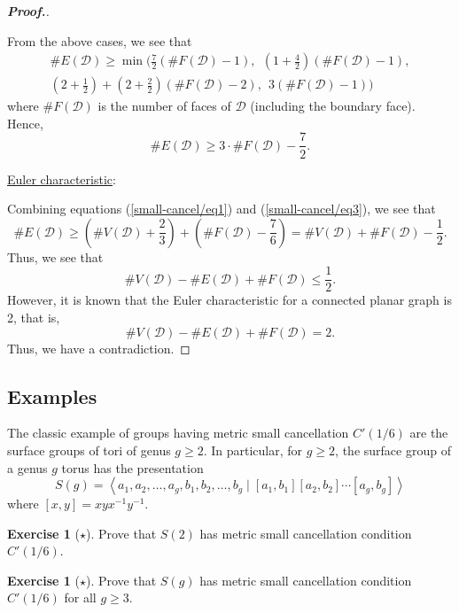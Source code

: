 \documentclass[11pt,a4paper,reqno]{amsart}
\theoremstyle{plain}
\theoremstyle{definition}
\theoremstyle{definition}
\newtheorem{exercise}[theorem]{Exercise}
\renewcommand\leq\leqslant
\renewcommand\geq\geqslant
\newenvironment{myproof}{\begin{proof}[\normalfont\bfseries Proof.]}{\end{proof}}
\newcommand\exerciseLevelEasy{$\star$}
\begin{document}
\begin{myproof}
\begin{enumerate}[label=(\roman*),ref=\roman*]
	\end{enumerate}
	\noindent
	From the above cases, we see that
	\begin{multline}\label{small-cancel/eq2}
		\#E(\mathcal D) \geq
		\min\Bigg(
		\frac{7}{2}\left( \#F(\mathcal D) - 1 \right),\ \
		\left(1 + \frac{4}{2}\right)\left( \#F(\mathcal D) - 1 \right),\\
		\left(2 +\frac{1}{2}\right)+ \left(2 + \frac{2}{2}\right)\left( \#F(\mathcal D) - 2 \right),\ \
		3\left( \#F(\mathcal D) - 1 \right)
		\Bigg)
	\end{multline}
	where $\#F(\mathcal D)$ is the number of faces of $\mathcal D$ (including the boundary face).
	Hence,
	\begin{equation}\label{small-cancel/eq3}
		\#E(\mathcal D) \geq
		3 \cdot \#F(\mathcal D) - \frac{7}{2}.
	\end{equation}

	\medskip
	\noindent
	\underline{Euler characteristic}:\nopagebreak

	\smallskip\nopagebreak
	\noindent\nopagebreak
	Combining equations (\ref{small-cancel/eq1}) and (\ref{small-cancel/eq3}), we see that
	\[
		\#E(\mathcal D)
		\geq
		\left(\#V(\mathcal D) + \frac{2}{3}\right)
		+
		\left(\#F(\mathcal D) - \frac{7}{6}\right)
		=
		\#V(\mathcal D) + \#F(\mathcal D) - \frac{1}{2}.
	\]
	Thus, we see that
	\[
		\#V(\mathcal D) - \#E(\mathcal D) + \#F(\mathcal D)\leq \frac{1}{2}.
	\]
	However, it is known that the Euler characteristic for a connected planar graph is 2, that is,
	\[\#V(\mathcal D) - \#E(\mathcal D) + \#F(\mathcal D)=2.\]
	Thus, we have a contradiction.
\end{myproof}

\subsection{Examples}
The classic example of groups having metric small cancellation $C'(1/6)$ are the surface groups of tori of genus $g\geq 2$.
In particular, for $g\geq 2$, the surface group of a genus $g$ torus has the presentation
\[
	S(g)
	=
	\left\langle
	a_1, a_2,\ldots, a_g,
	b_1, b_2,\ldots, b_g
	\mid
	[a_1, b_1][a_2,b_2]\cdots [a_g, b_g]
	\right\rangle
\]
where $[x,y] = xyx^{-1}y^{-1}$.

\begin{exercise}[\exerciseLevelEasy]
	Prove that $S(2)$ has metric small cancellation condition $C'(1/6)$.
\end{exercise}
\begin{exercise}[\exerciseLevelEasy]
	Prove that $S(g)$ has metric small cancellation condition $C'(1/6)$ for all $g\geq 3$.
\end{exercise}
\end{document}
